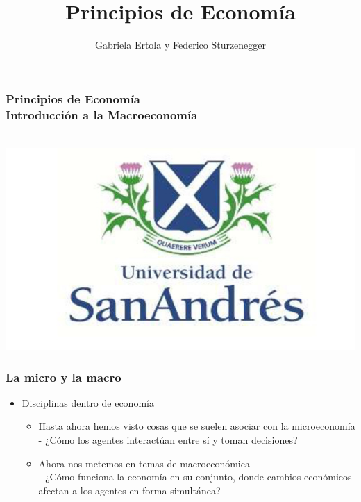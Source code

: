 \documentclass{beamer}
\title[Principios de Economía]{Principios de Economía}
\date{}
\author[Ertola y Sturzenegger]{Gabriela Ertola y Federico Sturzenegger }
\institute[]{Universidad de San Andrés \\
2022}
\begin{document}
\begin{frame}
\frametitle{Principios de Economía
\centering
\\ \vspace{12mm} Introducción a la Macroeconomía}
\centering
 \\ \vspace{12mm} %
\includegraphics[scale=0.25]{Figures/logoUDESA.jpg} 

\end{frame}


\begin{frame}
\frametitle{La micro y la macro}
\begin{itemize}
        \item Disciplinas dentro de economía
        \vspace{2mm}
        \begin{itemize}
        \item Hasta ahora hemos visto cosas que se suelen asociar con la microeconomía \\
        - ¿Cómo los agentes interactúan entre sí y toman decisiones?
        \vspace{2mm}
        \item Ahora nos metemos en temas de macroeconómica \\
        - ¿Cómo funciona la economía en su conjunto, donde cambios económicos afectan a los agentes en forma simultánea?
        \end{itemize}
\end{itemize}
\end{frame}
\end{document}
